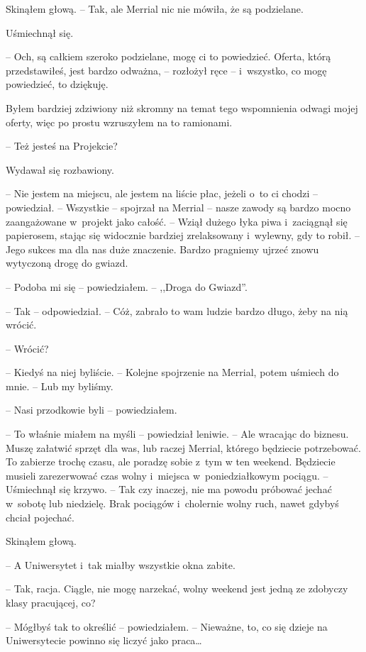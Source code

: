 \documentclass[oneside,polish,11pt,sfheadings]{mwbk}
\begin{document}
Skinąłem głową. -- Tak, ale Merrial nic nie mówiła, że są podzielane.

Uśmiechnął się. 

-- Och, są całkiem szeroko podzielane, mogę ci to
powiedzieć. Oferta, którą przedstawiłeś, jest bardzo odważna, -- rozłożył ręce -- i~wszystko, co mogę powiedzieć, to dziękuję.

Byłem bardziej zdziwiony niż skromny na temat tego wspomnienia odwagi
mojej oferty, więc po prostu wzruszyłem na to ramionami.

-- Też jesteś na Projekcie?

Wydawał się rozbawiony. 

-- Nie jestem na miejscu, ale jestem na liście
płac, jeżeli o~to ci chodzi -- powiedział. -- Wszystkie -- spojrzał na
Merrial -- nasze zawody są bardzo mocno zaangażowane w~projekt jako
całość. -- Wziął dużego łyka piwa i~zaciągnął się papierosem, stając się
widocznie bardziej zrelaksowany i~wylewny, gdy to robił. -- Jego sukces
ma dla nas duże znaczenie. Bardzo pragniemy ujrzeć znowu wytyczoną drogę
do gwiazd.

-- Podoba mi się -- powiedziałem. -- ,,Droga do Gwiazd''.

-- Tak -- odpowiedział. -- Cóż, zabrało to wam ludzie bardzo długo, żeby na
nią wrócić.

-- Wrócić?

-- Kiedyś na niej byliście. -- Kolejne spojrzenie na Merrial, potem
uśmiech do mnie. -- Lub my byliśmy.

-- Nasi przodkowie byli -- powiedziałem.

-- To właśnie miałem na myśli -- powiedział leniwie. -- Ale wracając do
biznesu. Muszę załatwić sprzęt dla was, lub raczej Merrial, którego
będziecie potrzebować. To zabierze trochę czasu, ale poradzę sobie z~tym
w ten weekend. Będziecie musieli zarezerwować czas wolny i~miejsca w~poniedziałkowym pociągu. -- Uśmiechnął się krzywo. -- Tak czy inaczej, nie
ma powodu próbować jechać w~sobotę lub niedzielę. Brak pociągów i~cholernie wolny ruch, nawet gdybyś chciał pojechać.

Skinąłem głową. 

-- A Uniwersytet i~tak miałby wszystkie okna zabite.

-- Tak, racja. Ciągle, nie mogę narzekać, wolny weekend jest jedną ze
zdobyczy klasy pracującej, co?

-- Mógłbyś tak to określić -- powiedziałem. -- Nieważne, to, co się dzieje
na Uniwersytecie powinno się liczyć jako praca\ldots
\end{document}
